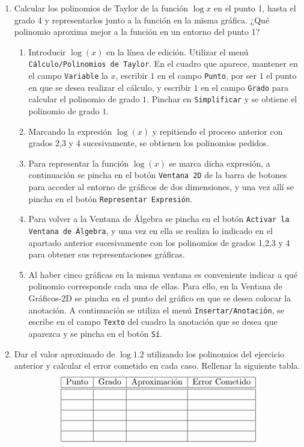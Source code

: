 \begin{enumerate}[leftmargin=*]
\item Calcular los polinomios de Taylor de la función $\log x$ en el punto 1, hasta el grado 4
 y representarlos junto a la función en la misma gráfica. ¿Qué polinomio aproxima mejor a la función en un entorno del punto 1?

\begin{indicacion}
{
\begin{enumerate}
\item Introducir $\log(x)$ en la línea de edición. Utilizar el menú
\texttt{Cálculo/Polinomios de Taylor}. En el cuadro que aparece,
mantener en el campo \texttt{Variable} la $x$, escribir $1$ en el
campo \texttt{Punto}, por ser $1$ el punto en que se desea realizar
el cálculo, y escribir $1$ en el campo \texttt{Grado} para calcular
el polinomio de grado $1$. Pinchar en \texttt{Simplificar} y se
obtiene el polinomio de grado $1$.
\item Marcando la expresión $\log(x)$ y repitiendo el proceso
anterior con grados 2,3 y 4 sucesivamente, se obtienen los
polinomios pedidos.
\item Para representar la función $\log(x)$ se marca dicha
expresión, a continuación se pincha en el botón \texttt{Ventana 2D}
de la barra de botones para acceder al entorno de gráficos de dos
dimensiones, y una vez allí se pincha en el botón
\texttt{Representar Expresión}.
\item Para volver a la Ventana de Álgebra se pincha en el botón
\texttt{Activar la Ventana de Álgebra}, y una vez en ella se realiza
lo indicado en el apartado anterior sucesivamente con los polinomios
de grados 1,2,3 y 4 para obtener sus representaciones gráficas.
\item Al haber cinco gráficas en la misma ventana es conveniente
indicar a qué polinomio corresponde cada una de ellas. Para ello, en
la Ventana de Gráficos-2D se pincha en el punto del gráfico en que
se desea colocar la anotación. A continuación se utiliza el menú
\texttt{Insertar/Anotación}, se escribe en el campo \texttt{Texto}
del cuadro la anotación que se desea que aparezca y se pincha en el
botón \texttt{Sí}.

\end{enumerate}
}
\end{indicacion}

\item Dar el valor aproximado de $\log 1.2$ utilizando los polinomios del ejercicio anterior y calcular el error cometido en cada caso. Rellenar la siguiente tabla.
\[
\begin{tabular}{|c|c|c|c|}
\hline
Punto & Grado & Aproximación
& Error Cometido \\
\hline\hline
&  &  &  \\ \hline
&  &  &  \\ \hline
&  &  &  \\ \hline
&  &  &  \\ \hline
&  &  &  \\ \hline
\end{tabular}
\]


\end{enumerate}
